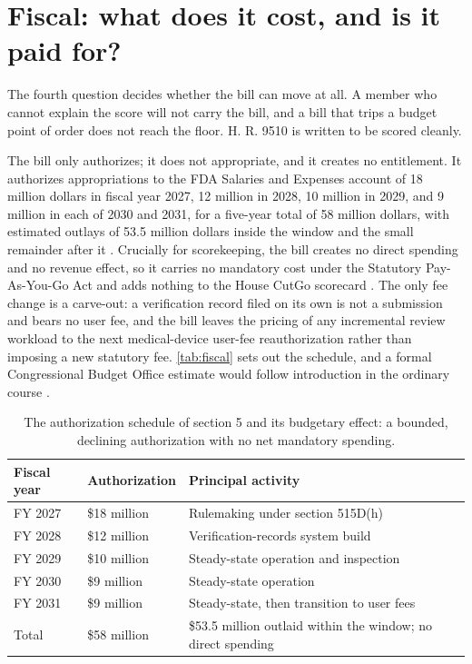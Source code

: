 \section{Fiscal: what does it cost, and is it paid for?}
\label{sec:fiscal}

The fourth question decides whether the bill can move at all. A member who cannot
explain the score will not carry the bill, and a bill that trips a budget point of
order does not reach the floor. H. R. 9510 is written to be scored cleanly.

The bill only authorizes; it does not appropriate, and it creates no entitlement. It
authorizes appropriations to the FDA Salaries and Expenses account of 18 million
dollars in fiscal year 2027, 12 million in 2028, 10 million in 2029, and 9 million in
each of 2030 and 2031, for a five-year total of 58 million dollars, with estimated
outlays of 53.5 million dollars inside the window and the small remainder after it
\cite{Kawchak2026HR9510Bill}. Crucially for scorekeeping, the bill creates no direct
spending and no revenue effect, so it carries no mandatory cost under the Statutory
Pay-As-You-Go Act and adds nothing to the House CutGo scorecard
\cite{paygo2010, houserules2025}. The only fee change is a carve-out: a verification
record filed on its own is not a submission and bears no user fee, and the bill
leaves the pricing of any incremental review workload to the next medical-device
user-fee reauthorization rather than imposing a new statutory fee. \autoref{tab:fiscal}
sets out the schedule, and a formal Congressional Budget Office estimate would follow
introduction in the ordinary course \cite{cbo2024costestimates}.

\begin{table}[H]
\footnotesize
\begin{tabularx}{\textwidth}{@{}L{2.6cm} C{3.0cm} Y@{}}
\toprule
\textbf{Fiscal year} & \textbf{Authorization} & \textbf{Principal activity}\\
\midrule
FY 2027 & \$18 million & Rulemaking under section 515D(h)\\
FY 2028 & \$12 million & Verification-records system build\\
FY 2029 & \$10 million & Steady-state operation and inspection\\
FY 2030 & \$9 million & Steady-state operation\\
FY 2031 & \$9 million & Steady-state, then transition to user fees\\
\midrule
Total & \$58 million & \$53.5 million outlaid within the window; no direct spending\\
\bottomrule
\end{tabularx}
\caption{The authorization schedule of section 5 and its budgetary effect: a bounded,
declining authorization with no net mandatory spending.}
\label{tab:fiscal}
\end{table}

